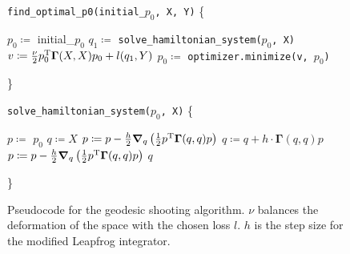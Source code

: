 \begin{figure}
	\centering
	\begin{minipage}{.45\linewidth}
		\scriptsize
		\begin{algorithmic}[1]
			\STATE \texttt{find\_optimal\_p0(initial\_$p_0$, X, Y)} \{
			\begin{ALC@g}
				\STATE $p_0 \coloneqq$ initial\_$p_0$
				 \label{code:p0-convergence}
				\STATE $q_1 \coloneqq$ \texttt{solve\_hamiltonian\_system($p_0$, X)}
				\STATE $v \coloneqq \frac{\nu}{2} p_0^{\mathrm{T}} \mathbf{\Gamma}(X, X)p_0 + l(q_1, Y)$
				\STATE $p_0 \coloneqq$ \texttt{optimizer.minimize(v, $p_0$)}
				\ENDWHILE
			\end{ALC@g}
			\STATE \}
		\end{algorithmic}
	\end{minipage}
	\hfill
	\begin{minipage}{.45\linewidth}
		\scriptsize
		\begin{algorithmic}[1]
			\setalglineno{9}
			\STATE \texttt{solve\_hamiltonian\_system($p_0$, X)} \{
			\begin{ALC@g}
				\STATE $p \coloneqq$ $p_0$
				\STATE $q \coloneqq X$
				\FOR{$i \coloneqq 1$ to  $\mathrm{int}(\frac{1}{h})$}
				\STATE $p \coloneqq p - \frac{h}{2} \grad_q\left(\frac{1}{2}p^{\mathrm{T}}\mathbf{\Gamma}(q, q)p\right)$
				\STATE $q \coloneqq q + h \cdot \mathbf{\Gamma}(q,q) p$
				\STATE $p \coloneqq p - \frac{h}{2} \grad_q\left(\frac{1}{2}p^{\mathrm{T}}\mathbf{\Gamma}(q, q)p\right)$
				\ENDFOR
				\RETURN $q$
			\end{ALC@g}
			
			\STATE \}
		\end{algorithmic}
	\end{minipage}
	\caption{Pseudocode for the geodesic shooting algorithm. $\nu$ balances the deformation of the space with the chosen loss $l$. $h$ is the step size for the modified Leapfrog integrator.}
	\label{fig:algo}
\end{figure}